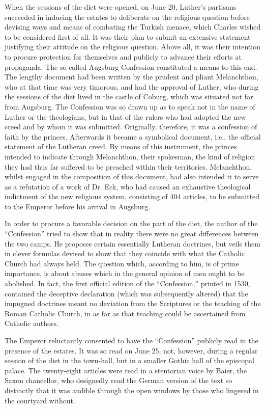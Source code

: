 When the sessions of the diet were opened, on June 20, Luther’s
partisans succeeded in inducing the estates to deliberate on the religious
question before devising ways and means of combating the
Turkish menace, which Charles wished to be considered first of all.
It was their plan to submit an extensive statement justifying their
attitude on the religious question. Above all, it was their intention to
procure protection for themselves and publicly to advance their efforts
at propaganda. The so-called Augsburg Confession constituted a
means to this end. The lengthy document had been written by the
prudent and pliant Melanchthon, who at that time was very timorous,
and had the approval of Luther, who during the sessions of the diet
lived in the castle of Coburg, which was situated not far from Augsburg.
The Confession was so drawn up as to speak not in the name of
Luther or the theologians, but in that of the rulers who had adopted
the new creed and by whom it was submitted. Originally, therefore,
it was a confession of faith by the princes. Afterwards it became a
symbolical document, i.e., the official statement of the Lutheran
creed. By means of this instrument, the princes intended to indicate
through Melanchthon, their spokesman, the kind of religion they had
thus far suffered to be preached within their territories. Melanchthon,
whilst engaged in the composition of this document, had also intended
it to serve as a refutation of a work of Dr. Eck, who had caused an
exhaustive theological indictment of the new religious system, consisting
of 404 articles, to be submitted to the Emperor before his arrival in
Augsburg.

In order to procure a favorable decision on the part of the diet, the
author of the “Confession” tried to show that in reality there were no
great differences between the two camps. He proposes certain essentially
Lutheran doctrines, but veils them in clever formulas devised
to show that they coincide with what the Catholic Church had always held.
The question which, according to him, is of prime importance,
is about abuses which in the general opinion of men ought to be
abolished. In fact, the first official edition of the “Confession,” printed
in 1530, contained the deceptive declaration (which was subsequently
altered) that the impugned doctrines meant no deviation from the
Scriptures or the teaching of the Roman Catholic Church, in as far
as that teaching could be ascertained from Catholic authors.

The Emperor reluctantly consented to have the “Confession”
publicly read in the presence of the estates. It was so read on June 25,
not, however, during a regular session of the diet in the town-hall,
but in a smaller Gothic hall of the episcopal palace. The twenty-eight
articles were read in a stentorian voice by Baier, the Saxon chancellor,
who designedly read the German version of the text so distinctly
that it was audible through the open windows by those who lingered
in the courtyard without.

